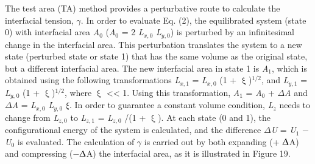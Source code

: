 \documentclass{scrbook}
\begin{document}
The test area (TA) method provides a perturbative route to calculate the
interfacial tension, {${\gamma}$}. In order to evaluate Eq. (2), the
equilibrated system (state 0) with interfacial area \textit{A}$_{0}$
(\textit{A}$_{0}$ = 2 \textit{L}$_{x,0}$ \textit{L}$_{y,0}$) is perturbed by an
infinitesimal change in the interfacial area. This perturbation translates the
system to a new state (perturbed state or state 1) that has the same volume as
the original state, but a different interfacial area. The new interfacial area
in state 1 is \textit{A}$_{1}$, which is obtained using the following
transformations \textit{L}$_{x,1}$ = \textit{L}$_{x,0}$ (1
+ {${\upxi}$})$^{\mathrm{1/2}}$, and \textit{L}$_{y,1}$
= \textit{L}$_{y,}$$_{0}$ (1 + {${\upxi}$})$^{\mathrm{ 1/2}}$, where
{${\upxi}$} {\textless}{\textless} 1. Using this transformation,
\textit{A}$_{1}$ = \textit{A}$_{0}$ + {${\Delta}$}\textit{A} and
{${\Delta}$}\textit{A} = \textit{L}$_{x,0}$ \textit{L}$_{y,0}$ {${\xi}$}. In
order to guarantee a constant volume condition, \textit{L}$_{z}$ needs to
change from \textit{L}$_{z,0}$ to \textit{L}$_{z,1}$ = \textit{L}$_{z,0}$ /(1
+ {${\upxi}$}). At each state (0 and 1), the configurational energy of the
system is calculated, and the difference {${\Delta}$}\textit{U}
= \textit{U}$_{1}$ ${-}$ \textit{U}$_{0}$ is evaluated. The calculation of
{${\gamma}$} is carried out by both expanding (+ {${\Updelta}$}A) and
compressing (${-}${${\Updelta}$}A) the interfacial area, as it is illustrated
in Figure 19.
\end{document}
